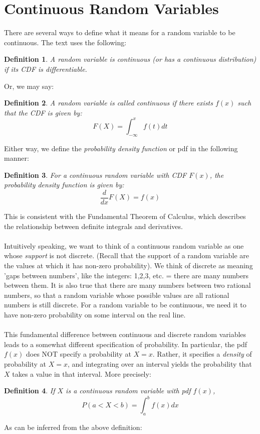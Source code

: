 \documentclass[12pt]{article} %
\newtheorem{defn}{Definition}
\begin{document}
\section{Continuous Random Variables}
There are several ways to define what it means for a random variable to be continuous. The text uses the following:
\begin{defn}
A random variable is continuous (or has a continuous distribution) if its CDF is differentiable.
\end{defn}
Or, we may say:
\begin{defn}
A random variable is called continuous if there exists $f(x)$ such that the CDF is given by:
$$F(X) = \int_{-\infty}^x f(t) dt$$
\end{defn}
Either way, we define the \emph{probability density function} or pdf in the following manner:
\begin{defn}
For a continuous random variable with CDF $F(x)$, the probability density function is given by:
$$\frac{d}{dx}F(X) = f(x)$$
\end{defn}
This is consistent with the Fundamental Theorem of Calculus, which describes the relationship between definite integrals and derivatives.\\\\
Intuitively speaking, we want to think of a continuous random variable as one whose \emph{support} is not discrete. (Recall that the support of a random variable are the values at which it has non-zero probability). We think of discrete as meaning 'gaps between numbers', like the integers: 1,2,3, etc. = there are many numbers between them. It is also true that there are many numbers between two rational numbers, so that a random variable whose possible values are all rational numbers is still discrete. For a random variable to be continuous, we need it to have non-zero probability on some interval on the real line.\\\\
This fundamental difference between continuous and discrete random variables leads to a somewhat different specification of probability. In particular, the pdf $f(x)$ does NOT specify a probability at $X=x$. Rather, it specifies a \emph{density} of probability at $X=x$, and integrating over an interval yields the probability that $X$ takes a value in that interval. More precisely:
\begin{defn}
If $X$ is a continuous random variable with pdf $f(x)$, 
$$P(a<X<b) = \int_a^b f(x) dx$$
\end{defn}
As can be inferred from the above definition:\\\\
\end{document}
